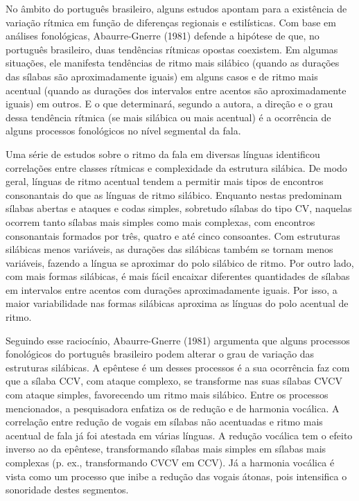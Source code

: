 \documentclass[12pt,a4paper,oneside]{article}
\begin{document}
	No âmbito do português brasileiro, alguns estudos apontam para a existência de variação rítmica em função de diferenças regionais e estilísticas. Com base em análises fonológicas, Abaurre-Gnerre (1981) defende a hipótese de que, no português brasileiro, duas tendências rítmicas opostas coexistem. Em algumas situações, ele manifesta tendências de ritmo mais silábico (quando as durações das sílabas são aproximadamente iguais) em alguns casos e de ritmo mais acentual (quando as durações dos intervalos entre acentos são aproximadamente iguais) em outros. E o que determinará, segundo a autora, a direção e o grau dessa tendência rítmica (se mais silábica ou mais acentual) é a ocorrência de alguns processos fonológicos no nível segmental da fala.
	
	Uma série de estudos sobre o ritmo da fala em diversas línguas identificou correlações entre classes rítmicas e complexidade da estrutura silábica. De modo geral, línguas de ritmo acentual tendem a permitir mais tipos de encontros consonantais do que as línguas de ritmo silábico. Enquanto nestas predominam sílabas abertas e ataques e codas simples, sobretudo sílabas do tipo CV, naquelas ocorrem tanto sílabas mais simples como mais complexas, com encontros consonantais formados por três, quatro e até cinco consoantes. Com estruturas silábicas menos variáveis, as durações das silábicas também se tornam menos variáveis, fazendo a língua se aproximar do polo silábico de ritmo. Por outro lado, com mais formas silábicas, é mais fácil encaixar diferentes quantidades de sílabas em intervalos entre acentos com durações aproximadamente iguais. Por isso, a maior variabilidade nas formas silábicas aproxima as línguas do polo acentual de ritmo.
	
	Seguindo esse raciocínio, Abaurre-Gnerre (1981) argumenta que alguns processos fonológicos do português brasileiro podem alterar o grau de variação das estruturas silábicas. A epêntese é um desses processos é a sua ocorrência faz com que a sílaba CCV, com ataque complexo, se transforme nas suas sílabas CVCV com ataque simples, favorecendo um ritmo mais silábico. Entre os processos mencionados, a pesquisadora enfatiza os de redução e de harmonia vocálica. A correlação entre redução de vogais em sílabas não acentuadas e ritmo mais acentual de fala já foi atestada em várias línguas. A redução vocálica tem o efeito inverso ao da epêntese, transformando sílabas mais simples em sílabas mais complexas (p. ex., transformando CVCV em CCV). Já a harmonia vocálica é vista como um processo que inibe a redução das vogais átonas, pois intensifica o sonoridade destes segmentos. 
	
\end{document}
